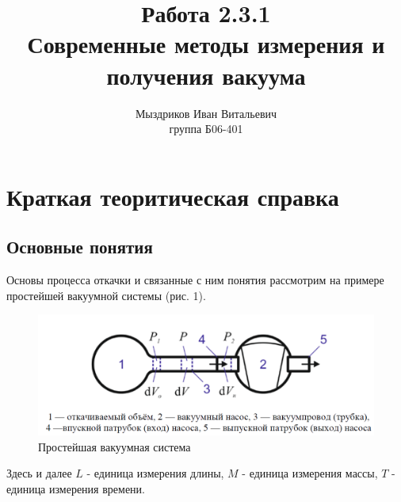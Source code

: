 \documentclass[a4paper, 12pt]{article}%
\author{Мыздриков Иван Витальевич \\
группа Б06-401}
\title{\textbf{Работа 2.3.1 \\ 
Современные методы измерения и получения вакуума}}
\begin{document}
\maketitle
\section*{Краткая теоритическая справка}
\subsection*{Основные понятия}
Основы процесса откачки и связанные с ним понятия рассмотрим на примере простейшей вакуумной системы (рис. 1).

\begin{figure}[h]
\includegraphics[width = \textwidth]{231_3.png}
\caption{Простейшая вакуумная система}
\end{figure}
Здесь и далее $L$ - единица измерения длины, $M$ - единица измерения массы, $T$ - единица измерения времени.
\end{document}
